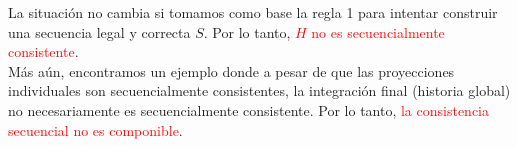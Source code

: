 La situación no cambia si tomamos como base la regla 1 para intentar construir una secuencia legal y correcta $S$.
Por lo tanto, \textcolor{red}{$H$ no es secuencialmente consistente}.\\
Más aún, encontramos un ejemplo donde a pesar de que las proyecciones individuales son secuencialmente consistentes, la integración final (historia global) no necesariamente es secuencialmente consistente. Por lo tanto, \textcolor{red}{la consistencia secuencial no es componible}.